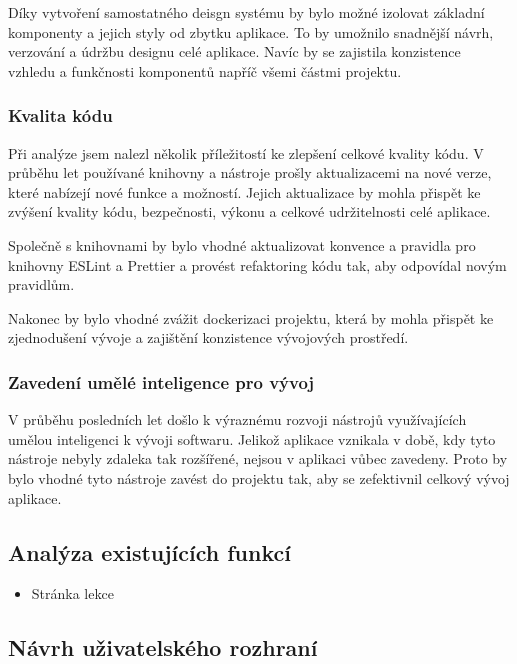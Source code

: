 Díky vytvoření samostatného deisgn systému by bylo možné izolovat základní komponenty a jejich styly od zbytku aplikace. To by umožnilo snadnější návrh, verzování a údržbu designu celé aplikace. Navíc by se zajistila konzistence vzhledu a funkčnosti komponentů napříč všemi částmi projektu.

\subsubsection{Kvalita kódu}


Při analýze jsem nalezl několik příležitostí ke zlepšení celkové kvality kódu. V průběhu let používané knihovny a nástroje prošly aktualizacemi na nové verze, které nabízejí nové funkce a možností. Jejich aktualizace by mohla přispět ke zvýšení kvality kódu, bezpečnosti, výkonu a celkové udržitelnosti celé aplikace.

Společně s knihovnami by bylo vhodné aktualizovat konvence a pravidla pro knihovny ESLint a Prettier a provést refaktoring kódu tak, aby odpovídal novým pravidlům.

Nakonec by bylo vhodné zvážit dockerizaci projektu, která by mohla přispět ke zjednodušení vývoje a zajištění konzistence vývojových prostředí.

\subsubsection{Zavedení umělé inteligence pro vývoj}

V průběhu posledních let došlo k výraznému rozvoji nástrojů využívajících umělou inteligenci k vývoji softwaru. Jelikož aplikace vznikala v době, kdy tyto nástroje nebyly zdaleka tak rozšířené, nejsou v aplikaci vůbec zavedeny. Proto by bylo vhodné tyto nástroje zavést do projektu tak, aby se zefektivnil celkový vývoj aplikace.


\subsection{Analýza existujících funkcí}


\begin{itemize}
    \item Stránka lekce %
\end{itemize}

\subsection{Návrh uživatelského rozhraní}

